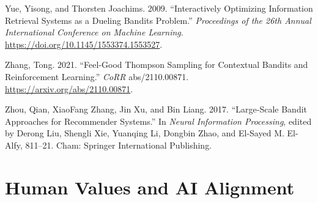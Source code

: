 \documentclass[
  letterpaper,
  DIV=11,
  numbers=noendperiod,
  oneside]{scrreprt}
\newlength{\cslhangindent}
\newenvironment{CSLReferences}[2] %
 {\begin{list}{}{%
  \setlength{\itemindent}{0pt}
  \setlength{\leftmargin}{0pt}
  \setlength{\parsep}{0pt}
  \ifodd #1
   \setlength{\leftmargin}{\cslhangindent}
   \setlength{\itemindent}{-1\cslhangindent}
  \fi
  \setlength{\itemsep}{#2\baselineskip}}}
 {\end{list}}
\let\oldchapter\chapter
\def\chapter{%
  \setcounter{sidenote}{1}%
  \oldchapter
}
\theoremstyle{remark}
\begin{document}
\begin{CSLReferences}{1}{0}
Yue, Yisong, and Thorsten Joachims. 2009. {``Interactively Optimizing
Information Retrieval Systems as a Dueling Bandits Problem.''}
\emph{Proceedings of the 26th Annual International Conference on Machine
Learning}. \url{https://doi.org/10.1145/1553374.1553527}.

Zhang, Tong. 2021. {``Feel-Good Thompson Sampling for Contextual Bandits
and Reinforcement Learning.''} \emph{CoRR} abs/2110.00871.
\url{https://arxiv.org/abs/2110.00871}.

Zhou, Qian, XiaoFang Zhang, Jin Xu, and Bin Liang. 2017. {``Large-Scale
Bandit Approaches for Recommender Systems.''} In \emph{Neural
Information Processing}, edited by Derong Liu, Shengli Xie, Yuanqing Li,
Dongbin Zhao, and El-Sayed M. El-Alfy, 811--21. Cham: Springer
International Publishing.

\end{CSLReferences}


\chapter{Human Values and AI
Alignment}\label{human-values-and-ai-alignment}
\end{document}
